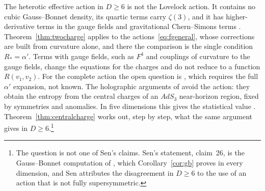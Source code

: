 \begin{remark}\label{rem:heterotic}
The heterotic effective action in $D\ge6$ is not the Lovelock action. It contains no cubic Gauss--Bonnet density, its quartic terms carry $\zeta(3)$, and it has higher-derivative terms in the gauge fields \cite[Section~6]{Prester06} and gravitational Chern--Simons terms \cite[footnote~6]{Prester13}. Theorem~\ref{thm:twocharge} applies to the actions~\eqref{eq:fgeneral}, whose corrections are built from curvature alone, and there the comparison is the single condition $R_*=\alpha'$. Terms with gauge fields, such as $F^4$ and couplings of curvature to the gauge fields, change the equations for the charges and do not reduce to a function $R(v_1,v_2)$. For the complete action the open question is , which requires the full $\alpha'$ expansion, not known. The holographic arguments of \cite{DM08,KLS07} avoid the action: they obtain the entropy from the central charges of an $AdS_3$ near-horizon region, fixed by symmetries and anomalies. In five dimensions this gives the statistical value \cite{DM08}. Theorem~\ref{thm:centralcharge} works out, step by step, what the same argument gives in $D\ge6$.\footnote{The question is not one of Sen's claims. Sen's statement, claim~26, is the Gauss--Bonnet computation of \cite{Sen05stretching}, which Corollary~\ref{cor:gb} proves in every dimension, and Sen attributes the disagreement in $D\ge6$ to the use of an action that is not fully supersymmetric.}
\end{remark}

